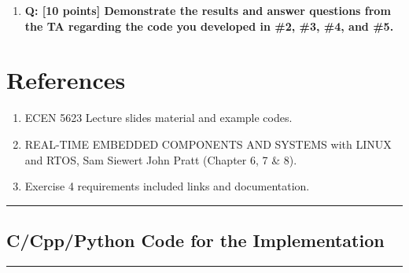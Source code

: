 \documentclass[a4paper,11pt]{article}%
\newenvironment{qanda}{\setlength{\parindent}{0pt}}{\bigskip}
\newcommand{\Q}{\bigskip\bfseries Q: }
\begin{document}
\begin{qanda}
\begin{enumerate}
	\end{enumerate}

	\begin{enumerate}
		\section{Question 6}
		\item[] \Q [10 points] Demonstrate the results and answer questions from the TA regarding the code
			you developed in \#2, \#3, \#4, and \#5.
	\end{enumerate}



	\section{References}
	\begin{enumerate}
		\item ECEN 5623 Lecture slides material and example codes.
		\item REAL-TIME EMBEDDED COMPONENTS AND SYSTEMS with LINUX and RTOS, Sam Siewert John
		      Pratt (Chapter 6, 7 \& 8).
		\item Exercise 4 requirements included links and documentation.
	\end{enumerate}


\end{qanda}




\vfill
\hrule
\vspace{0.5cm}
\pagebreak
\begin{appendices}
	\section{C/Cpp/Python Code for the Implementation}

	
	
	
\end{appendices}


\vspace{1cm}
\hrule
\vspace{0.5cm}


\end{document}
